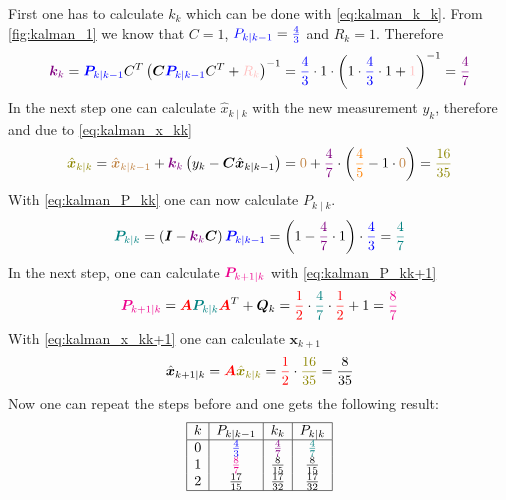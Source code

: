 First one has to calculate $k_k$ which can be done with \autoref{eq:kalman_k_k}. From \autoref{fig:kalman_1} we know that $C=1$, $\textcolor{blue}{P_{k \mid k-1}}=\textcolor{blue}{\frac{4}{3}}$ and $R_k=1$. Therefore
$$
\textcolor{violet}{\boldsymbol{k}_k}=\textcolor{blue}{\boldsymbol{P}_{k \mid k-1}} C^T\left(\boldsymbol{C} \textcolor{blue}{\boldsymbol{P}_{k \mid k-1}} C^T+\textcolor{pink}{R_k}\right)^{-1}=\textcolor{blue}{\frac{4}{3}} \cdot 1 \cdot \left(1\cdot \textcolor{blue}{\frac{4}{3}}\cdot 1 +\textcolor{pink}{1} \right)^{-1}=\textcolor{violet}{\frac{4}{7}}
$$
In the next step one can calculate $\hat{x}_{k \mid k}$ with the new measurement $y_k$, therefore and due to \autoref{eq:kalman_x_kk}
$$
\textcolor{olive}{\hat{\boldsymbol{x}}_{k \mid k}}=\textcolor{brown}{\hat{\boldsymbol{x}}_{k \mid k-1}}+\textcolor{violet}{\boldsymbol{k}_k}\left(y_k-\boldsymbol{C} \hat{\boldsymbol{x}}_{k \mid k-1}\right)=\textcolor{brown}{0}+\textcolor{violet}{\frac{4}{7}}\cdot \left(\textcolor{orange}{\frac{4}{5}} - 1 \cdot \textcolor{brown}{0} \right)=\textcolor{olive}{\frac{16}{35}}
$$
With \autoref{eq:kalman_P_kk} one can now calculate $P_{k \mid k}$.
$$
\textcolor{teal}{\boldsymbol{P}_{k \mid k}}=\left(\boldsymbol{I}-\textcolor{violet}{\boldsymbol{k}_k} \boldsymbol{C}\right) \textcolor{blue}{\boldsymbol{P}_{k \mid k-1}}=\left(1-\textcolor{violet}{\frac{4}{7}}\cdot 1 \right) \cdot \textcolor{blue}{\frac{4}{3}}=\textcolor{teal}{\frac{4}{7}}
$$
In the next step, one can calculate $\textcolor{magenta}{\boldsymbol{P}_{k+1 \mid k}}$ with \autoref{eq:kalman_P_kk+1}
$$
\textcolor{magenta}{\boldsymbol{P}_{k+1 \mid k}}=\textcolor{red}{\boldsymbol{A}} \textcolor{teal}{\boldsymbol{P}_{k \mid k}} \textcolor{red}{\boldsymbol{A}}^T+\boldsymbol{Q}_k=\textcolor{red}{\frac{1}{2}}\cdot \textcolor{teal}{\frac{4}{7}} \cdot \textcolor{red}{\frac{1}{2}} +1=\textcolor{magenta}{\frac{8}{7}}
$$
With \autoref{eq:kalman_x_kk+1} one can calculate $\boldsymbol{x}_{k+1}$
$$
\hat{\boldsymbol{x}}_{k+1 \mid k}=\textcolor{red}{\boldsymbol{A}} \textcolor{olive}{\hat{\boldsymbol{x}}_{k \mid k}}=\textcolor{red}{\frac{1}{2}}\cdot \textcolor{olive}{\frac{16}{35}}=\frac{8}{35}
$$
Now one can repeat the steps before and one gets the following result:
$$
\begin{array}{|c|c|c|c|}
\hline k & P_{k \mid k-1} & k_k & P_{k \mid k} \\
\hline 0 & \textcolor{blue}{\frac{4}{3}} & \textcolor{violet}{\frac{4}{7}} & \textcolor{teal}{\frac{4}{7}} \\
1 & \textcolor{magenta}{\frac{8}{7}} & \frac{8}{15} & \frac{8}{15} \\
2 & \frac{17}{15} & \frac{17}{32} & \frac{17}{32} \\
\hline
\end{array}
$$




